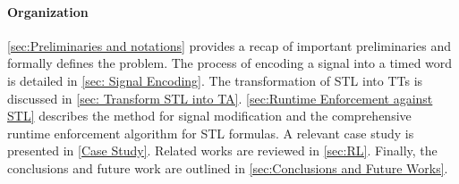 \paragraph{Organization} \cref{sec:Preliminaries and notations} provides a recap of important preliminaries and formally defines the problem. The process of encoding a signal into a timed word is detailed in \cref{sec: Signal Encoding}. The transformation of STL into TTs is discussed in \cref{sec: Transform STL into TA}. \cref{sec:Runtime Enforcement against STL} describes the method for signal modification and the comprehensive runtime enforcement algorithm for STL formulas. A relevant case study is presented in \cref{Case Study}. Related works are reviewed in \cref{sec:RL}. Finally, the conclusions and future work are outlined in \cref{sec:Conclusions and Future Works}. 





%
%





